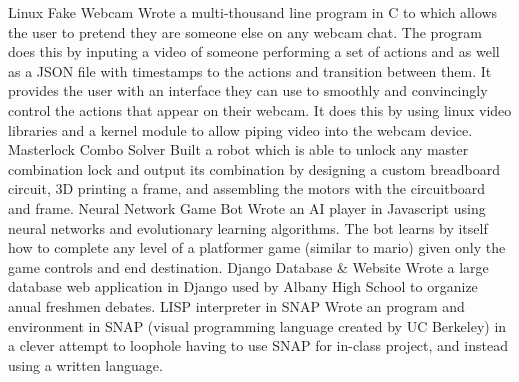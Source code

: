 


\begin{cvskills}

  \cvskill
    {Linux Fake Webcam} %
    {Wrote a multi-thousand line program in C to which allows the user to pretend they are someone else on any webcam chat. The program does this by inputing a video of someone performing a set of actions and as well as a JSON file with timestamps to the actions and transition between them. It provides the user with an interface they can use to smoothly and convincingly control the actions that appear on their webcam. It does this by using linux video libraries and a kernel module to allow piping video into the webcam device.} %
\cvskill
    {Masterlock Combo Solver} %
    {Built a robot which is able to unlock any master combination lock and output its combination by designing a custom breadboard circuit, 3D printing a frame, and assembling the motors with the circuitboard and frame.} %
\cvskill
  {Neural Network Game Bot}
  {Wrote an AI player in Javascript using neural networks and evolutionary learning algorithms. The bot learns by itself how to complete any level of a platformer game (similar to mario) given only the game controls and end destination.}
  \cvskill
    {Django Database \& Website} %
    {Wrote a large database web application in Django used by Albany High School to organize anual freshmen debates.} %
  \cvskill
    {LISP interpreter in SNAP} %
    {Wrote an program and environment in  SNAP (visual programming language created by UC Berkeley) in a clever attempt to loophole having to use SNAP for in-class project, and instead using a written language.} %

\end{cvskills}
